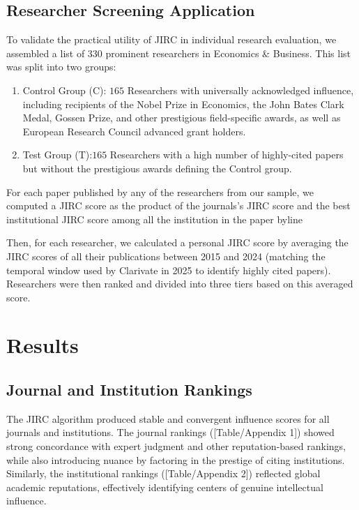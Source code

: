 \documentclass[10pt]{article}
\begin{document}
\subsection{Researcher Screening Application}
To validate the practical utility of JIRC in individual research evaluation, we assembled a list of  330 prominent researchers in Economics \& Business. This list was split into two groups:
\begin{enumerate}
  \item Control Group (C): $165$ Researchers with universally acknowledged influence, including recipients of the Nobel Prize in Economics, the John Bates Clark Medal, Gossen Prize, and other prestigious field-specific awards, as well as European Research Council advanced grant holders.
  \item Test Group (T):$165$ Researchers with a high number of highly-cited papers but without the prestigious awards defining the Control group.
\end{enumerate}
For each paper published by any of the researchers from our sample, we computed a JIRC score as the product of the journals's JIRC score and the best institutional JIRC score among all the institution in the paper byline

Then, for each researcher, we calculated a personal JIRC score by averaging the JIRC scores of all their publications between 2015 and 2024 (matching the  temporal window used by Clarivate in 2025 to identify highly cited papers). Researchers were then ranked and divided into three tiers based on this averaged score.

\section{Results}
\subsection{Journal and Institution Rankings}
The JIRC algorithm produced stable and convergent influence scores for all journals and institutions. The journal rankings ([Table/Appendix 1]) showed strong concordance with expert judgment and other reputation-based rankings, while also introducing nuance by factoring in the prestige of citing institutions. Similarly, the institutional rankings ([Table/Appendix 2]) reflected global academic reputations, effectively identifying centers of genuine intellectual influence.
\end{document}
